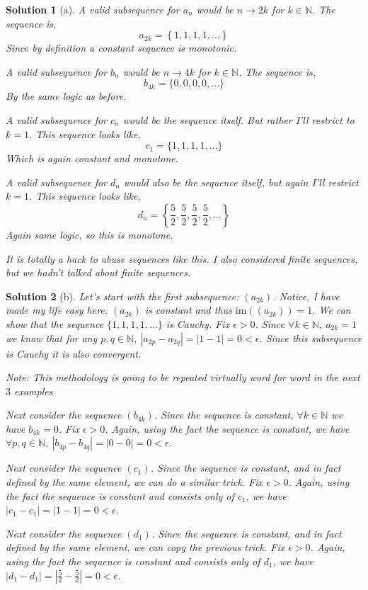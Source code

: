 \documentclass[leqno]{article}
\theoremstyle{nonumberplain}
\newtheorem{solution}{Solution}
\begin{document}
\begin{solution}[a]
A valid subsequence for $a_n$ would be $n \to 2k$ for $k \in \mathbb{N}$.  The sequence is,
\[
a_{2k} = \left\{1,1,1,1,...\right\}
\]
Since by definition a constant sequence is monotonic.

A valid subsequence for $b_n$ would be $n \to 4k$ for $k \in \mathbb{N}$. The sequence is,
\[
b_{4k} = \{0,0,0,0,...\}
\]
By the same logic as before.

A valid subsequence for $c_n$ would be the sequence itself. But rather I'll restrict to $k = 1$.  This sequence looks like,
\[
c_1 = \{1,1,1,1,...\}
\]
Which is again constant and monotone.

A valid subsequence for $d_n$ would also be the sequence itself, but again I'll restrict $k=1$. This sequence looks like,
\[
d_n = \left\{\frac{5}{2},\frac{5}{2},\frac{5}{2},\frac{5}{2},...\right\}
\]
Again same logic, so this is monotone.

It is totally a hack to abuse sequences like this.  I also considered finite sequences, but we hadn't talked about finite sequences.
\end{solution}

\begin{solution}[b]
Let's start with the first subsequence: $(a_{2k})$.  Notice, I have made my life easy here. $(a_{2k})$ is constant and thus $\mathrm{im}((a_{2k}))={1}$.  We can show that the sequence $\{1,1,1,1,...\}$ is Cauchy.  Fix $\epsilon >0$.  Since $\forall k \in \mathbb{N}$, $a_{2k}=1$ we know that for any $p,q \in \mathbb{N}$, $|a_{2p} - a_{2q}|=|1-1|=0<\epsilon$.  Since this subsequence is Cauchy it is also convergent.

\vspace{5mm}

Note: This methodology is going to be repeated virtually word for word in the next $3$ examples

\vspace{5mm}

Next consider the sequence $(b_{4k})$.  Since the sequence is constant, $\forall k \in \mathbb{N}$ we have $b_{4k} = 0$.  Fix $\epsilon >0$.  Again, using the fact the sequence is constant, we have $\forall p,q \in \mathbb{N}$, $|b_{4p}-b_{4q}| = |0-0| = 0 < \epsilon$.

\vspace{5mm}

Next consider the sequence $(c_{1})$. Since the sequence is constant, and in fact defined by the same element, we can do a similar trick.  Fix $\epsilon >0$.  Again, using the fact the sequence is constant and consists only of $c_1$, we have $|c_1-c_1| = |1-1| = 0 < \epsilon$.

\vspace{5mm}

Next consider the sequence $(d_{1})$. Since the sequence is constant, and in fact defined by the same element, we can copy the previous trick.  Fix $\epsilon >0$.  Again, using the fact the sequence is constant and consists only of $d_1$, we have $|d_1-d_1| = |\frac{5}{2}-\frac{5}{2}| = 0 < \epsilon$.
\end{solution}
\end{document}
